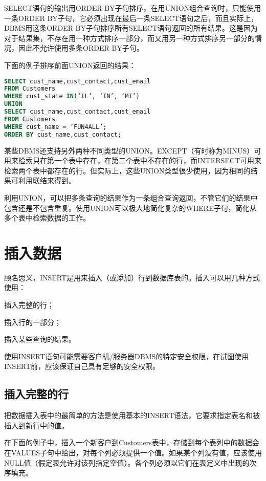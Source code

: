 SELECT语句的输出用ORDER BY子句排序。在用UNION组合查询时，只能使用一条ORDER BY子句，它必须出现在最后一条SELECT语句之后，而且实际上，DBMS用这条ORDER BY子句排序所有SELECT语句返回的所有结果。这是因为对于结果集，不存在用一种方式排序一部分，而又用另一种方式排序另一部分的情况，因此不允许使用多条ORDER BY子句。


下面的例子排序前面UNION返回的结果：

\begin{lstlisting}[language=SQL]
SELECT cust_name,cust_contact,cust_email
FROM Customers
WHERE cust_state IN(‘IL’, ‘IN’, ‘MI’)
UNION
SELECT cust_name,cust_contact,cust_email
FROM Customers
WHERE cust_name = ‘FUN4ALL’;
ORDER BY cust_name,cust_contact;
\end{lstlisting}

某些DBMS还支持另外两种不同类型的UNION。EXCEPT（有时称为MINUS）可用来检索只在第一个表中存在，在第二个表中不存在的行，而INTERSECT可用来检索两个表中都存在的行。但实际上，这些UNION类型很少使用，因为相同的结果可利用联结来得到。

利用UNION，可以把多条查询的结果作为一条组合查询返回，不管它们的结果中包含还是不包含重复。使用UNION可以极大地简化复杂的WHERE子句，简化从多个表中检索数据的工作。


\section{插入数据}

顾名思义，INSERT是用来插入（或添加）行到数据库表的。插入可以用几种方式使用：


\begin{compactitem}
\item 插入完整的行；
\item 插入行的一部分；
\item 插入某些查询的结果。
\end{compactitem}

使用INSERT语句可能需要客户机/服务器DBMS的特定安全权限，在试图使用INSERT前，应该保证自己具有足够的安全权限。


\subsection{插入完整的行}



把数据插入表中的最简单的方法是使用基本的INSERT语法，它要求指定表名和被插入到新行中的值。

在下面的例子中，插入一个新客户到Customers表中，存储到每个表列中的数据会在VALUES子句中给出，对每个列必须提供一个值。如果某个列没有值，应该使用NULL值（假定表允许对该列指定空值）。各个列必须以它们在表定义中出现的次序填充。


